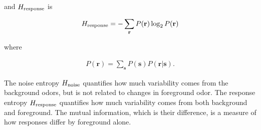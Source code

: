 \documentclass[9pt,lineno]{elife}
\begin{document}
{and $H_{\textup{response}}$ is

\begin{align*}
H_{\textup{response}} = -\sum_{\mathbf r} P(\mathbf r) \log_2 P(\mathbf r)
\end{align*}

where

\begin{align*}
P(\mathbf r) = \sum_{\mathbf s} P(\mathbf s) P(\mathbf r| \mathbf s).
\end{align*}

The noise entropy $H_{\textup{noise}}$ quantifies how much variability comes from the background odors, but is not related to changes in foreground odor. The response entropy $H_{\textup{response}}$ quantifies how much variability comes from both background and foreground. The mutual information, which is their difference, is a measure of how responses differ by foreground alone.}





\end{document}
